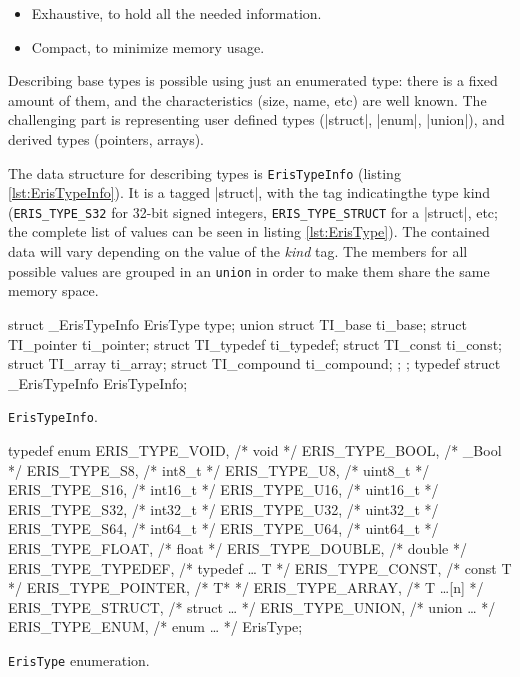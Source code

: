 \begin{itemize}
  \item Exhaustive, to hold all the needed information.
  \item Compact, to minimize memory usage.
\end{itemize}

Describing base types is possible using just an enumerated type: there is
a fixed amount of them, and the characteristics (size, name, etc) are well
known. The challenging part is representing user defined types (\Mc|struct|,
\Mc|enum|, \Mc|union|), and derived types (pointers, arrays).

The data structure for describing types is \verb|ErisTypeInfo| (listing
\vref{lst:ErisTypeInfo}). It is a tagged \Mc|struct|, with the tag
indicatingthe type kind (\verb|ERIS_TYPE_S32| for 32-bit signed integers,
\verb|ERIS_TYPE_STRUCT| for a \Mc|struct|, etc; the complete list of values
can be seen in listing \vref{lst:ErisType}). The contained data will vary
depending on the value of the \emph{kind} tag. The members for all possible
values are grouped in an \texttt{union} in order to make them share the
same memory space.

\begin{listing}[H]
  \begin{ccode}
    struct _ErisTypeInfo {
      ErisType type;
      union {
        struct TI_base     ti_base;
        struct TI_pointer  ti_pointer;
        struct TI_typedef  ti_typedef;
        struct TI_const    ti_const;
        struct TI_array    ti_array;
        struct TI_compound ti_compound;
      };
    };
    typedef struct _ErisTypeInfo ErisTypeInfo;
  \end{ccode}
  \caption{\texttt{ErisTypeInfo}.}
  \label{lst:ErisTypeInfo}
\end{listing}

\begin{listing}[f]
  \centering
  \begin{ccode}
    typedef enum {
      ERIS_TYPE_VOID,    /* void        */
      ERIS_TYPE_BOOL,    /* _Bool       */
      ERIS_TYPE_S8,      /* int8_t      */
      ERIS_TYPE_U8,      /* uint8_t     */
      ERIS_TYPE_S16,     /* int16_t     */
      ERIS_TYPE_U16,     /* uint16_t    */
      ERIS_TYPE_S32,     /* int32_t     */
      ERIS_TYPE_U32,     /* uint32_t    */
      ERIS_TYPE_S64,     /* int64_t     */
      ERIS_TYPE_U64,     /* uint64_t    */
      ERIS_TYPE_FLOAT,   /* float       */
      ERIS_TYPE_DOUBLE,  /* double      */
      ERIS_TYPE_TYPEDEF, /* typedef … T */
      ERIS_TYPE_CONST,   /* const T     */
      ERIS_TYPE_POINTER, /* T*          */
      ERIS_TYPE_ARRAY,   /* T …[n]      */
      ERIS_TYPE_STRUCT,  /* struct …    */
      ERIS_TYPE_UNION,   /* union …     */
      ERIS_TYPE_ENUM,    /* enum …      */
    } ErisType;
  \end{ccode}
  \caption{\texttt{ErisType} enumeration.}
  \label{lst:ErisType}
\end{listing}


